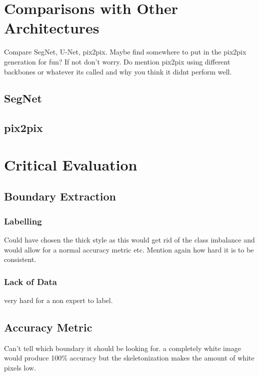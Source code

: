 \section{Comparisons with Other Architectures}

Compare SegNet, U-Net, pix2pix. Maybe find somewhere to put in the pix2pix generation for fun? If not don't worry. Do mention pix2pix using different backbones or whatever its called and why you think it didnt perform well.

\subsection{SegNet}

\subsection{pix2pix}



\section{Critical Evaluation}

\subsection{Boundary Extraction}

\subsubsection{Labelling}

Could have chosen the thick style as this would get rid of the class imbalance and would allow for a normal accuracy metric etc. Mention again how hard it is to be consistent.

\subsubsection{Lack of Data}

very hard for a non expert to label.

\subsection{Accuracy Metric}

Can't tell which boundary it should be looking for. a completely white image would produce 100\% accuracy but the skeletonization makes the amount of white pixels low.

